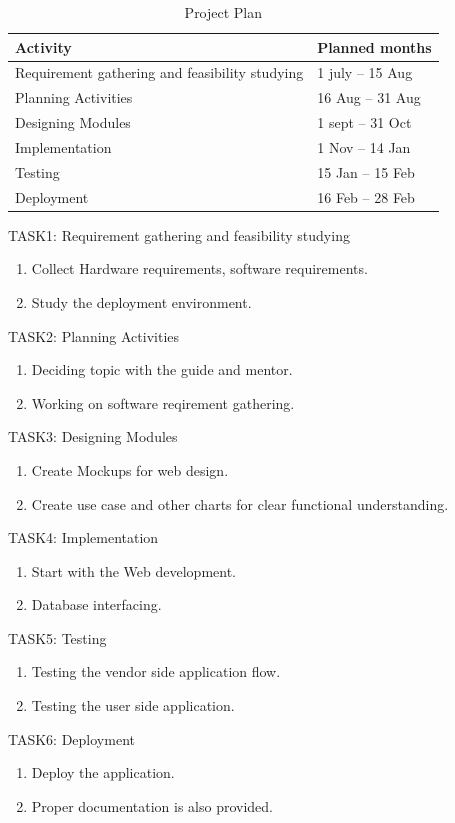 \documentclass[oneside,a4paper,12pt]{report}
\begin{document}
\begin{table}[!htbp]
\begin{center}
\def\arraystretch{1.5}
\begin{tabularx}{\textwidth}{| X | X |}
\hline
Activity	& Planned months\\
\hline
Requirement gathering and feasibility studying        &1 july – 15 Aug\\
\hline
Planning Activities       &16 Aug – 31 Aug\\
\hline
Designing Modules        &1 sept – 31 Oct\\
\hline
Implementation           &1 Nov – 14 Jan\\
\hline
Testing                  &15 Jan – 15 Feb\\
\hline
Deployment               &16 Feb – 28 Feb\\
\hline
\end{tabularx}
\end{center}
\caption{Project Plan}
\label{tab:usecase}
\end{table}
TASK1: Requirement gathering and feasibility studying
\begin{enumerate}
\item Collect Hardware requirements, software requirements. 
\item Study the deployment environment.
\end{enumerate}
TASK2: Planning Activities
\begin{enumerate}
\item Deciding topic with the guide and mentor. 
\item Working on software reqirement gathering.
\end{enumerate}
TASK3: Designing Modules
\begin{enumerate}
\item Create Mockups for web design. 
\item Create use case and other charts for clear functional understanding.
\end{enumerate}
TASK4: Implementation
\begin{enumerate}
\item Start with the Web development.
\item Database interfacing.
\end{enumerate}
TASK5: Testing 
\begin{enumerate}
\item Testing the vendor side application flow.
\item Testing the user side application.
\end{enumerate}
TASK6: Deployment
\begin{enumerate}
\item Deploy the application.
\item Proper documentation is also provided.
\end{enumerate}
\end{document}
